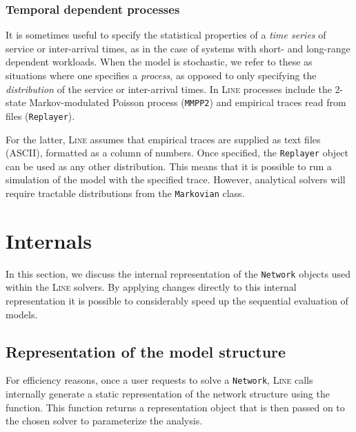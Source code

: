 \subsubsection{Temporal dependent processes}
It is sometimes useful to specify the statistical properties of a {\em time series} of service or inter-arrival times, as in the case of systems with short- and long-range dependent workloads. When the model is stochastic, we refer to these as situations where one specifies a {\em process}, as opposed to only specifying the {\em distribution} of the service or inter-arrival times. In \textsc{Line} processes include the 2-state Markov-modulated Poisson process (\texttt{MMPP2}) and empirical traces read from files (\texttt{Replayer}).

For the latter, \textsc{Line} assumes that empirical traces are supplied as text files (ASCII), formatted as a column of numbers. Once specified, the \texttt{Replayer} object can be used as any other distribution. This means that it is possible to run a simulation of the model with the specified trace. However, analytical solvers will require tractable distributions from the \texttt{Markovian} class.

\section{Internals}
In this section, we discuss the internal representation of the \texttt{Network} objects used within the \textsc{Line} solvers. By applying changes directly to this internal representation it is possible to considerably speed up the sequential evaluation of  models.

\subsection{Representation of the model structure}
For efficiency reasons, once a user requests to solve a \texttt{Network}, \textsc{Line} calls internally generate a static representation of the network structure using the  function. This function returns a representation object that is then passed on to the chosen solver to parameterize the analysis.

